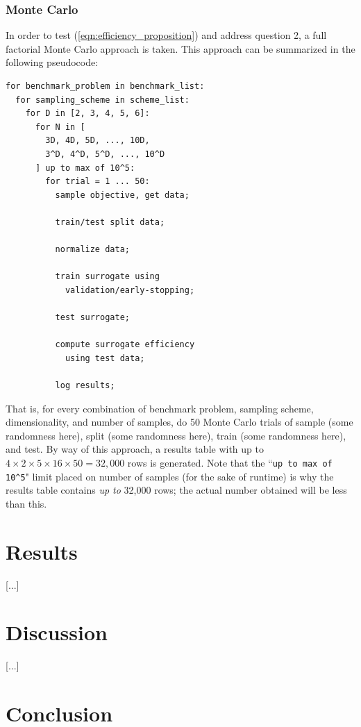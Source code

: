 \documentclass[conference]{IEEEtran}
\begin{document}
\subsubsection{Monte Carlo}

In order to test (\ref{eqn:efficiency_proposition}) and address question 2, a full factorial Monte Carlo approach is taken. This approach can be summarized in the following pseudocode:

\begin{verbatim}
for benchmark_problem in benchmark_list:
  for sampling_scheme in scheme_list:
    for D in [2, 3, 4, 5, 6]:
      for N in [
      	3D, 4D, 5D, ..., 10D,
      	3^D, 4^D, 5^D, ..., 10^D
      ] up to max of 10^5:
        for trial = 1 ... 50:
          sample objective, get data;
      
          train/test split data;
      
          normalize data;
      
          train surrogate using
            validation/early-stopping;
        
          test surrogate;
        
          compute surrogate efficiency
            using test data;
        
          log results;
\end{verbatim}

\noindent That is, for every combination of benchmark problem, sampling scheme, dimensionality, and number of samples, do 50 Monte Carlo trials of sample (some randomness here), split (some randomness here), train (some randomness here), and test. By way of this approach, a results table with up to $4\times 2\times 5\times 16\times 50 = 32,000$ rows is generated. Note that the ``\texttt{up to max of 10\^{}5}" limit placed on number of samples (for the sake of runtime) is why the results table contains \textit{up to} 32,000 rows; the actual number obtained will be less than this.

\section{Results}

[...]

\section{Discussion}

[...]

\section{Conclusion}
\end{document}

